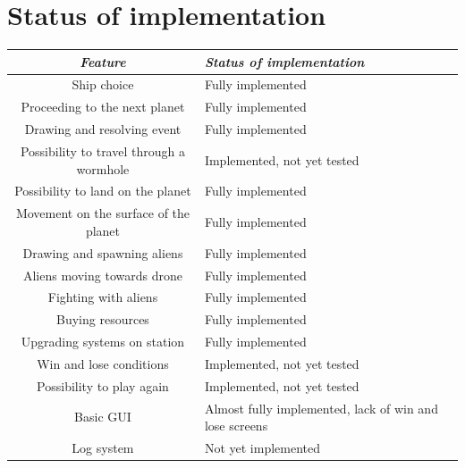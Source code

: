 \documentclass[a4paper,12pt]{article}
\begin{document}
\section{Status of implementation}
\begin{table}[H]
		\begin{tabularx}{\linewidth}{|c|X|}
			\hline
			\textit{\textbf{Feature}} & \textit{\textbf{Status of implementation}}\\
			\hline
			Ship choice & Fully implemented\\
			\hline
			Proceeding to the next planet & Fully implemented\\
			\hline
			Drawing and resolving event & Fully implemented\\
			\hline
			Possibility to travel through a wormhole & Implemented, not yet tested\\
			\hline
			Possibility to land on the planet & Fully implemented\\
			\hline
			Movement on the surface of the planet & Fully implemented\\
			\hline
			Drawing and spawning aliens & Fully implemented\\
			\hline
			Aliens moving towards drone & Fully implemented\\
			\hline
			Fighting with aliens & Fully implemented\\
			\hline
			Buying resources & Fully implemented\\
			\hline
			Upgrading systems on station & Fully implemented\\
			\hline
			Win and lose conditions & Implemented, not yet tested\\
			\hline
			Possibility to play again & Implemented, not yet tested\\
			\hline
			Basic GUI & Almost fully implemented, lack of win and lose screens\\
			\hline
			Log system & Not yet implemented\\
			\hline
			\end{tabularx}
\end{table}
\end{document}
